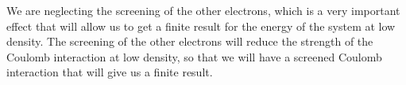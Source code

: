 We are neglecting the screening of the other electrons, which is a very important effect that will allow us to get a finite result for the energy of the system at low density. The screening of the other electrons will reduce the strength of the Coulomb interaction at low density, so that we will have a screened Coulomb interaction that will give us a finite result.